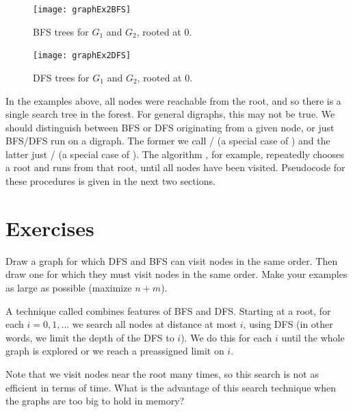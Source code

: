 \begin{figure}[hbtp]
	\centering
	\texttt{[image: graphEx2BFS]}
	\caption{BFS trees for $G_1$ and $G_2$, rooted at $0$.}
	\label{fig:graphEx2-BFS}
\end{figure}

\begin{figure}[hbtp]
	\centering 
	\texttt{[image: graphEx2DFS]}
	\caption{DFS trees for $G_1$ and $G_2$, rooted at $0$.}
	\label{fig:graphEx2-DFS}
\end{figure}

In the examples above, all nodes were reachable from the root, and so
there is a single search tree in the forest. For general digraphs, this
may not be true. We should distinguish between BFS or DFS originating
from a given node, or just BFS/DFS run on a digraph. The former we call
/ (a special case of ) 
and the
latter just / (a special case of ). 
The algorithm , for example, repeatedly chooses a root and runs
 from that root, until all nodes have been visited.
Pseudocode for these procedures is given in the next two sections.

\section*{Exercises}

\begin{Exercise}
\label{exr:bfs-vs-dfs}
Draw a graph for which DFS and BFS can visit nodes in the same order. Then 
draw one for which they must visit nodes in the same order. Make your examples 
as large as possible (maximize $n+m$).
\end{Exercise}

\begin{Exercise}
\label{exr:iterative-deep}
A technique called  combines features of BFS and DFS.
Starting at a root, for each $i = 0, 1, \dots$ we search all nodes at distance 
at most $i$, using DFS (in other words, we limit the depth of the DFS to $i$). 
We do this for each $i$ until the whole graph is explored or we reach a 
preassigned limit on $i$.

Note that we visit nodes near the root many times, so this search is not as 
efficient in terms of time.  What is the advantage of this search
technique when the graphs are too big to hold in memory? 
\end{Exercise}

